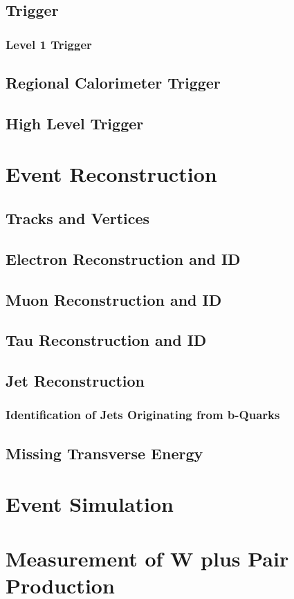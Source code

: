 \documentclass[oneside, letterpaper, 12pt, oldfontcommands]{memoir}
\begin{document}
 \section{Trigger}
  \subsection{Level 1 Trigger}
 \section{Regional Calorimeter Trigger}
 \section{High Level Trigger}
\chapter{Event Reconstruction}
\section{Tracks and Vertices}
\section{Electron Reconstruction and ID}
\section{Muon Reconstruction and ID}
\section{Tau Reconstruction and ID}
\section{Jet Reconstruction}
\subsection{Identification of Jets Originating from b-Quarks}
\section{Missing Transverse Energy}
\chapter{Event Simulation}

\chapter{Measurement of W plus \bbbar Pair Production}
\end{document}

